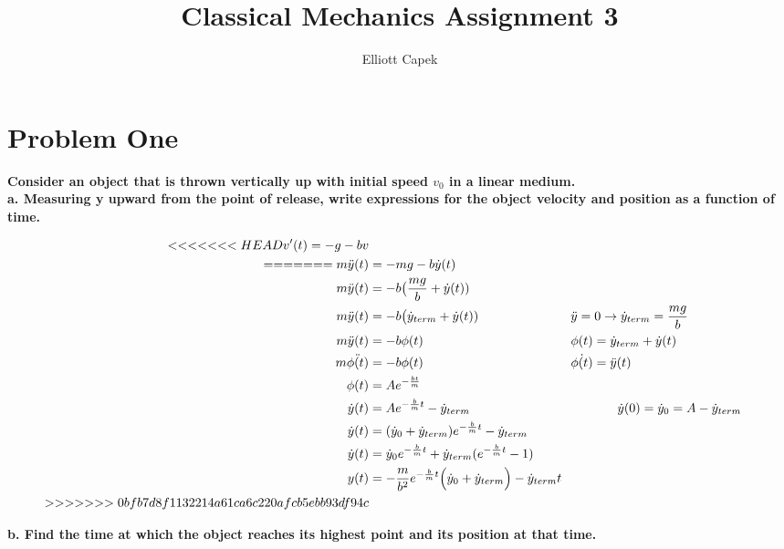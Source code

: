 \documentclass[10pt]{article} %
\title{Classical Mechanics Assignment 3}
\author{Elliott Capek}
\begin{document}
\maketitle{}

\section{Problem One}
\textbf{Consider an object that is thrown vertically up with initial speed $v_0$ in a linear medium.} \\

\textbf{a. Measuring y upward from the point of release, write expressions for the object velocity and position as a function of time.}

\begin{align*}
<<<<<<< HEAD
  v'(t) = -g - bv\\
  
=======
  m\ddot{y}(t) &= -mg - b\dot{y}(t)\\
  m\ddot{y}(t) &= -b\big(\frac{mg}{b} + \dot{y}(t))\\
  m\ddot{y}(t) &= -b\big(\dot{y}_{term} + \dot{y}(t))
  \hspace{1in}\ddot{y} = 0 \rightarrow \dot{y}_{term} = \frac{mg}{b}\\
  m\ddot{y}(t) &= -b\phi(t)
  \hspace{1.6in} \phi(t) = \dot{y}_{term} + \dot{y}(t)\\
  m\ddot{\phi(t)} &= -b\phi(t)
  \hspace{1.6in} \dot{\phi(t)} = \ddot{y}(t)\\
  \phi(t) &= Ae^{-\frac{bt}{m}}\\
  \dot{y}(t) &= Ae^{-\frac{b}{m}t} - \dot{y}_{term}
  \hspace{1.6in} \dot{y}(0) = \dot{y}_0 = A - \dot{y}_{term}\\
  \dot{y}(t) &= (\dot{y}_0 + \dot{y}_{term})e^{-\frac{b}{m}t} - \dot{y}_{term}\\
  \dot{y}(t) &= \dot{y}_0e^{-\frac{b}{m}t} + \dot{y}_{term}(e^{-\frac{b}{m}t} - 1)\\
  y(t) &= -\frac{m}{b^2}e^{-\frac{b}{m}t}\Big(\dot{y}_0 + \dot{y}_{term} \Big) - \dot{y}_{term}t\\
>>>>>>> 0bfb7d8f1132214a61ca6c220afcb5ebb93df94c
\end{align*}

\textbf{b. Find the time at which the object reaches its highest point and its position at that time.}
\end{document}
